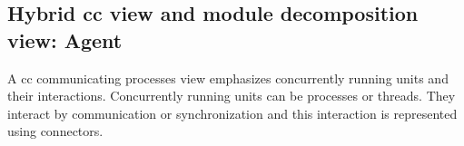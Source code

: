 \documentclass{llncs}
\begin{document}

\subsection{Hybrid \gls{cc} view and module decomposition view: Agent}
\label{sec:hybrid-view}

A \gls{cc} communicating processes view emphasizes concurrently running units and their interactions. Concurrently running units can be processes or threads. They interact by communication or synchronization and this interaction is represented using connectors. %
\end{document}
